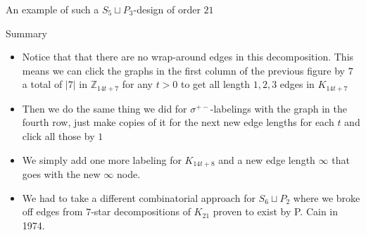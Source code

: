 \documentclass{beamer}
\theoremstyle{plain}
\newcommand{\ZZ}{\ensuremath{\mathbb{Z}}}
\begin{document}
\begin{frame}{An example of such a $S_{5}\sqcup P_{3}$-design of order $21$}
\end{frame}

\begin{frame}{Summary}
\begin{itemize}
\item Notice that that there are no wrap-around edges in this decomposition. This means we can click the graphs in the first column of the previous figure by $7$ a total of $|7|$ in $\ZZ_{14t+7}$ for any $t>0$ to get all length $1,2,3$ edges in $K_{14t+7}$
\item Then we do the same thing we did for $\sigma^{+-}$-labelings with the graph in the fourth row, just make copies of it for the next new edge lengths for each $t$ and click all those by $1$
\item We simply add one more labeling for $K_{14t+8}$ and a new edge length $\infty$ that goes with the new $\infty$ node.
\item We had to take a different combinatorial approach for $S_{6}\sqcup P_{2}$ where we broke off edges from $7$-star decompositions of $K_{21}$ proven to exist by P. Cain in 1974.
\end{itemize}
\end{frame}
\end{document}

